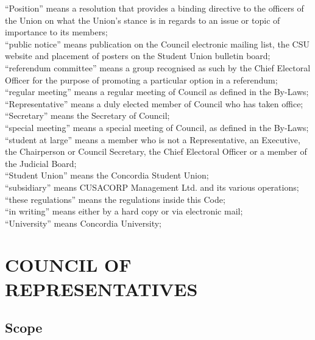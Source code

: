 \documentclass[oneside]{book}
\begin{document}
“Position” means a resolution that provides a binding directive to the 
officers of the Union on what the Union’s stance is in regards to an issue 
or topic of importance to its members; \\
``public notice'' means publication on the
Council electronic mailing list, the CSU website and placement of
posters on the Student Union bulletin board; \\
``referendum committee'' means a group recognised
as such by the Chief Electoral Officer for the purpose of promoting
a particular option in a referendum; \\
``regular meeting'' means a regular meeting
of Council as defined in the By-Laws; \\
``Representative'' means a duly elected
member of Council who has taken office; \\
``Secretary'' means the Secretary of Council;
\\
``special meeting'' means a special meeting
of Council, as defined in the By-Laws; \\
``student at large'' means a member who
is not a Representative, an Executive, the Chairperson or Council
Secretary, the Chief Electoral Officer or a member of the Judicial
Board; \\
``Student Union'' means the Concordia Student
Union; \\
``subsidiary'' means CUSACORP Management
Ltd. and its various operations; \\
``these regulations'' means the regulations
inside this Code; \\
``in writing'' means either by a hard copy
or via electronic mail; \\
``University'' means Concordia University; 
\setcounter{secnumdepth}{3}


\part{\label{COUNCIL_OF_REPRESENTATIVES}COUNCIL OF REPRESENTATIVES}


\chapter{\label{Council_Scope}Scope }
\end{document}
